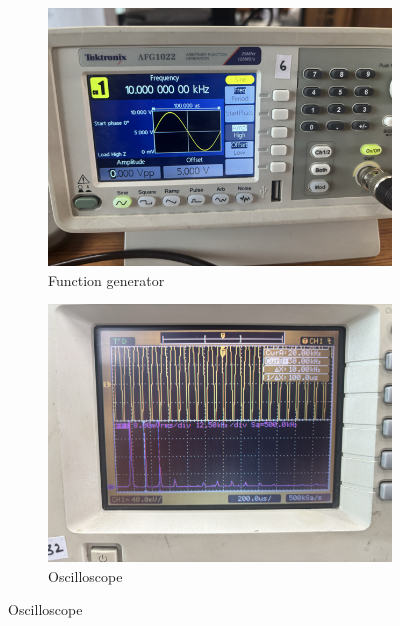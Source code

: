 \documentclass[12pt,a4paper]{article}
\begin{document}
\begin{figure}[h!]
\centering
\begin{subfigure}[b]{0.47\linewidth}
    \centering
    \includegraphics[width=\textwidth]{Experiment_5/figs/FFT_gen_3.png}
    \caption{Function generator}
\end{subfigure}
\begin{subfigure}[b]{0.48\linewidth}
    \centering
    \includegraphics[width=\textwidth]{Experiment_5/figs/FFT_osc_3.png}
    \caption{Oscilloscope}
\end{subfigure}
\end{figure}
\end{document}
